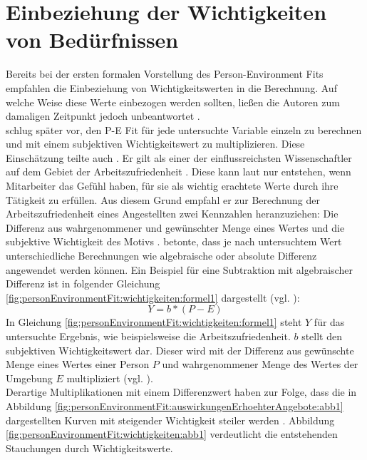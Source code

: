 \section{Einbeziehung der Wichtigkeiten von Bedürfnissen}
\label{ch:personEnvironmentFit:wichtigkeiten}
Bereits bei der ersten formalen Vorstellung des Person-Environment Fits empfahlen \textcite{copingAndAdaption:1974} die Einbeziehung von Wichtigkeitswerten in die Berechnung. Auf welche Weise diese Werte einbezogen werden sollten, ließen die Autoren zum damaligen Zeitpunkt jedoch unbeantwortet \cite[S. 19]{edwards:2008}.\\
\textcite[S. 38]{harrison:1985} schlug später vor, den P-E Fit für jede untersuchte Variable einzeln zu berechnen und mit einem subjektiven Wichtigkeitswert zu multiplizieren. Diese Einschätzung teilte auch \textcite[S. 18]{locke:1969}\cite[S. 8f.]{locke:1976}. Er gilt als einer der einflussreichsten Wissenschaftler auf dem Gebiet der Arbeitszufriedenheit \cite[S. 12]{edwards:2008}. Diese kann laut \textcite[S. 8]{locke:1969} nur entstehen, wenn Mitarbeiter das Gefühl haben, für sie als wichtig erachtete Werte durch ihre Tätigkeit zu erfüllen. Aus diesem Grund empfahl er zur Berechnung der Arbeitszufriedenheit eines Angestellten zwei Kennzahlen heranzuziehen: Die Differenz aus wahrgenommener und gewünschter Menge eines Wertes und die subjektive Wichtigkeit des Motivs \cite[S. 8]{locke:1976}. \textcite[S. 16]{locke:1969} betonte, dass je nach untersuchtem Wert unterschiedliche Berechnungen wie algebraische oder absolute Differenz angewendet werden können. Ein Beispiel für eine Subtraktion mit algebraischer Differenz ist in folgender Gleichung \ref{fig:personEnvironmentFit:wichtigkeiten:formel1} dargestellt (vgl. \cite[S. 9]{edwards:1990}):
\begin{equation}
	Y = b * (P - E)
	\label{fig:personEnvironmentFit:wichtigkeiten:formel1}
\end{equation}
In Gleichung \ref{fig:personEnvironmentFit:wichtigkeiten:formel1} steht $Y$ für das untersuchte Ergebnis, wie beispielsweise die Arbeitszufriedenheit. $b$ stellt den subjektiven Wichtigkeitswert dar. Dieser wird mit der Differenz aus gewünschte Menge eines Wertes einer Person $P$ und wahrgenommener Menge des Wertes der Umgebung $E$ multipliziert (vgl. \cite[S. 9f.]{edwards:1990}).\\
Derartige Multiplikationen mit einem Differenzwert haben zur Folge, dass die in Abbildung \ref{fig:personEnvironmentFit:auswirkungenErhoehterAngebote:abb1} dargestellten Kurven mit steigender Wichtigkeit steiler werden \cite[S. 9]{locke:1976}. Abbildung \ref{fig:personEnvironmentFit:wichtigkeiten:abb1} verdeutlicht die entstehenden Stauchungen durch Wichtigkeitswerte.\\
